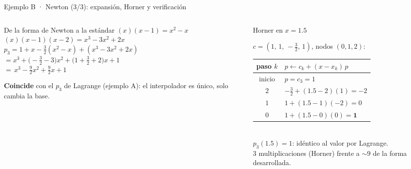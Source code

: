 \documentclass[aspectratio=169,10pt]{beamer}
\begin{document}
\begin{frame}{Ejemplo B · Newton (3/3): expansión, Horner y verificación}
\begin{columns}[T]
\begin{column}{0.50\textwidth}
\begin{cardgear}{De la forma de Newton a la estándar}{\faSuperscript}
{\footnotesize
$(x)(x{-}1)=x^2-x$\\[0.4mm]
$(x)(x{-}1)(x{-}2)=x^3-3x^2+2x$\\[1.0mm]
$p_3=1+x-\tfrac32(x^2-x)+(x^3-3x^2+2x)$\\[0.4mm]
$=x^3+\big(-\tfrac32-3\big)x^2+\big(1+\tfrac32+2\big)x+1$\\[0.4mm]
$=\boxed{\,x^3-\tfrac92x^2+\tfrac92x+1\,}$}
\end{cardgear}
\vspace{1mm}
\begin{cardnota}[\faInfoCircle]
{\footnotesize \textbf{Coincide} con el $p_3$ de Lagrange (ejemplo A): el interpolador es único, solo cambia la base.}
\end{cardnota}
\end{column}
\begin{column}{0.48\textwidth}
\begin{cardidea}{Horner en $x=1.5$}{\faCalculator}
{\footnotesize $c=(1,\,1,\,-\tfrac32,\,1)$, nodos $(0,1,2)$:\\[0.6mm]
\centering
\renewcommand{\arraystretch}{1.25}\setlength{\tabcolsep}{5pt}
\begin{tabular}{c|l}
paso $k$ & $p\leftarrow c_k+(x-x_k)\,p$\\\hline
inicio & $p=c_3=1$\\
$2$ & $-\tfrac32+(1.5{-}2)(1)=-2$\\
$1$ & $1+(1.5{-}1)(-2)=0$\\
$0$ & $1+(1.5{-}0)(0)=\mathbf 1$\\
\end{tabular}}\\[1.2mm]
{\footnotesize $p_3(1.5)=1$: idéntico al valor por Lagrange. \checkmark\\[0.4mm]
$3$ multiplicaciones (Horner) frente a $\sim9$ de la forma desarrollada.}
\end{cardidea}
\end{column}
\end{columns}
\end{frame}
\end{document}
